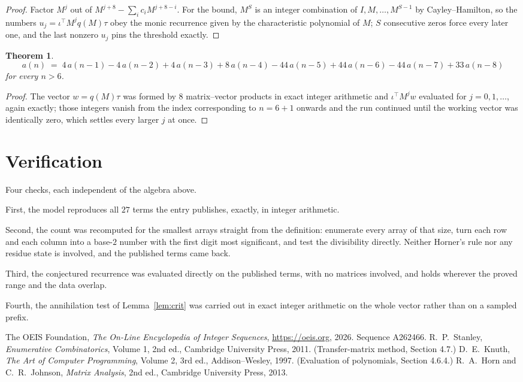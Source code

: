 \documentclass[11pt,a4paper]{article}
\theoremstyle{plain}
\newtheorem{theorem}{Theorem}
\theoremstyle{definition}
\begin{document}
\begin{proof}
Factor $M^{j}$ out of $M^{j+8}-\sum_ic_iM^{j+8-i}$. For the bound, $M^{S}$
is an integer combination of $I,M,\dots,M^{S-1}$ by Cayley--Hamilton, so the numbers
$u_j=\iota^{\!\top}M^{j}q(M)\tau$ obey the monic recurrence given by the characteristic
polynomial of $M$; $S$ consecutive zeros force every later one, and the last nonzero $u_j$
pins the threshold exactly.
\end{proof}

\begin{theorem}
\[
a(n)\;=\;4\,a(n-1) - 4\,a(n-2) + 4\,a(n-3) + 8\,a(n-4) - 44\,a(n-5) + 44\,a(n-6) - 44\,a(n-7) + 33\,a(n-8)
\]
for every $n>6$.
\end{theorem}

\begin{proof}
The vector $w=q(M)\tau$ was formed by $8$ matrix--vector products in exact integer
arithmetic and $\iota^{\!\top}M^{j}w$ evaluated for $j=0,1,\dots$, again exactly; those
integers vanish from the index corresponding to $n=6+1$ onwards and the run continued
until the working vector was identically zero, which settles every larger $j$ at once.
\end{proof}

\section{Verification}

Four checks, each independent of the algebra above.

First, the model reproduces all $27$ terms the entry publishes, exactly, in integer
arithmetic.

Second, the count was recomputed for the smallest arrays straight from the definition:
enumerate every array of that size, turn each row and each column into a base-$2$ number with
the first digit most significant, and test the divisibility directly. Neither Horner's rule nor
any residue state is involved, and the published terms came back.

Third, the conjectured recurrence was evaluated directly on the published terms, with no
matrices involved, and holds wherever the proved range and the data overlap.

Fourth, the annihilation test of Lemma~\ref{lem:crit} was carried out in exact integer
arithmetic on the whole vector rather than on a sampled prefix.

\begin{thebibliography}{9}
 The OEIS Foundation, \emph{The On-Line Encyclopedia of Integer
Sequences}, \url{https://oeis.org}, 2026. Sequence A262466.
 R.~P.~Stanley, \emph{Enumerative Combinatorics}, Volume 1, 2nd ed.,
Cambridge University Press, 2011. (Transfer-matrix method, Section 4.7.)
 D.~E.~Knuth, \emph{The Art of Computer Programming}, Volume 2, 3rd ed.,
Addison--Wesley, 1997. (Evaluation of polynomials, Section 4.6.4.)
 R.~A.~Horn and C.~R.~Johnson, \emph{Matrix Analysis}, 2nd ed., Cambridge
University Press, 2013.
\end{thebibliography}
\end{document}
